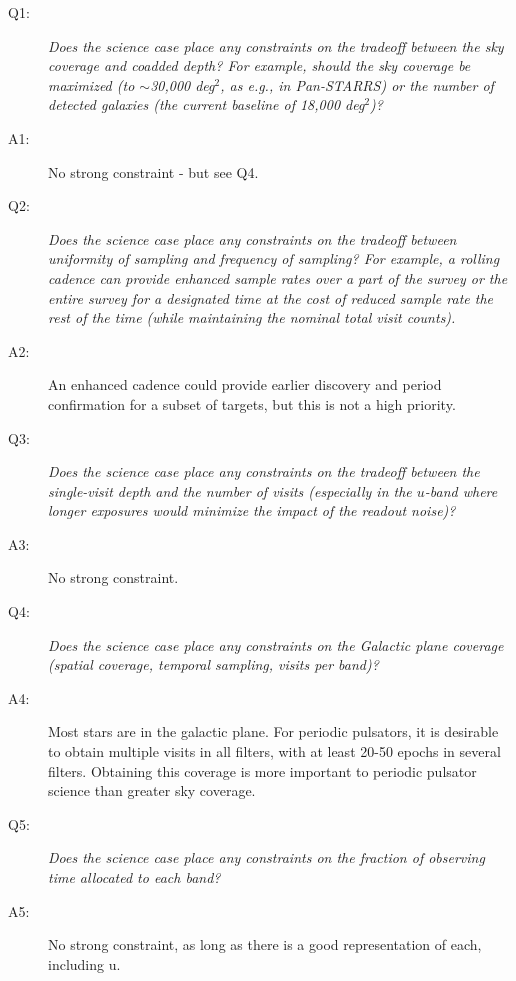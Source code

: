  \begin{description}

 \item[Q1:] {\it Does the science case place any constraints on the
 tradeoff between the sky coverage and coadded depth? For example, should
 the sky coverage be maximized (to $\sim$30,000 deg$^2$, as e.g., in
 Pan-STARRS) or the number of detected galaxies (the current baseline 
 of 18,000 deg$^2$)?}

 \item[A1:] No strong constraint - but see Q4.

 \item[Q2:] {\it Does the science case place any constraints on the
 tradeoff between uniformity of sampling and frequency of  sampling? For
 example, a rolling cadence can provide enhanced sample rates over a part
 of the survey or the entire survey for a designated time at the cost of
 reduced sample rate the rest of the time (while maintaining the nominal
 total visit counts).}

 \item[A2:] An enhanced cadence could provide earlier discovery and period confirmation for a subset of targets, but this is not a high priority.

 \item[Q3:] {\it Does the science case place any constraints on the
 tradeoff between the single-visit depth and the number of visits
 (especially in the $u$-band where longer exposures would minimize the
 impact of the readout noise)?}

 \item[A3:] No strong constraint.

 \item[Q4:] {\it Does the science case place any constraints on the
 Galactic plane coverage (spatial coverage, temporal sampling, visits per
 band)?}

 \item[A4:] Most stars are in the galactic plane. For periodic pulsators, it is desirable to obtain multiple visits
in all filters, with at least 20-50 epochs in several filters. Obtaining this coverage is more important to periodic 
pulsator science than greater sky coverage.

 \item[Q5:] {\it Does the science case place any constraints on the
 fraction of observing time allocated to each band?}

 \item[A5:] No strong constraint, as long as there is a good representation of each, including u.


\end{description}

